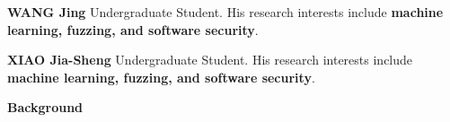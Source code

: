 \documentclass[10.5pt,compsoc]{CjC}
\theoremstyle{mystyle}
\begin{document}
\begin{biography}
  \noindent
  \textbf{WANG Jing} Undergraduate Student. His research interests include \textbf{machine learning, fuzzing, and software security}.
\end{biography}

\vspace{10mm}
\begin{biography}
\noindent
\textbf{XIAO Jia-Sheng} Undergraduate Student. His research interests include \textbf{machine learning, fuzzing, and software security}.
\end{biography}

\vspace{20mm}

\noindent \textbf{Background}

 
\end{document}
